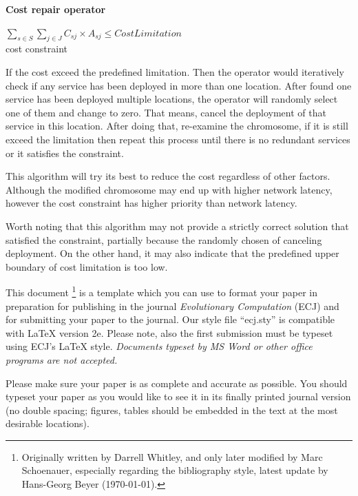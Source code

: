 \documentclass[twoside]{article}
\begin{document}
\begin{flushleft}\textbf{Cost repair operator}\end{flushleft}
	\begin{center} 
		$\sum\limits_{s \in S} \sum\limits_{j \in J} C_{sj} \times A_{sj} \leq CostLimitation$ \\
		cost constraint
\end{center}

If the cost exceed the predefined limitation. Then the operator would iteratively check if any service has 
been deployed in more than one location. After found one service has been deployed multiple locations, 
the operator will randomly select one of them and change to zero. That means, cancel the deployment of 
that service in this location. After doing that, re-examine the chromosome, if it is still exceed the 
limitation then repeat this process until there is no redundant services or it satisfies the constraint.

This algorithm will try its best to reduce the cost regardless of other factors. Although the modified 
chromosome may end up with higher network latency, however the cost constraint has higher priority than network latency.

Worth noting that this algorithm may not provide a strictly correct solution that satisfied the constraint, 
partially because the randomly chosen of canceling deployment. On the other hand, it may also indicate that 
the predefined upper boundary of cost limitation is too low.
















This document%
\footnote{Originally written by Darrell Whitley, and only later
  modified by Marc Schoenauer, especially regarding the bibliography style,
  latest update by Hans-Georg Beyer (\today).} 
is a template which you can use to format your paper in 
preparation for publishing in the journal {\em Evolutionary Computation} 
(ECJ) and for submitting your paper to the journal. Our style file 
``ecj.sty'' is compatible with \LaTeX{} version 2e. Please note, also the 
first submission must be typeset using ECJ's \LaTeX{} style. {\em Documents 
typeset by MS Word or other office programs are not accepted.}   

Please make sure your paper is as complete and accurate as possible. You 
should typeset your paper as you would like to see it 
in its finally printed journal version (no double spacing; figures, tables 
should be embedded in the text at the most desirable locations). 
\end{document}
